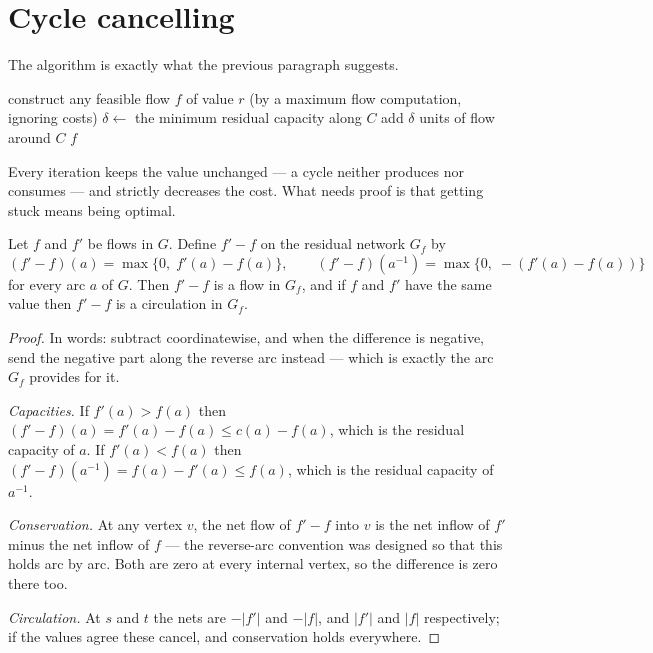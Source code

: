 \section{Cycle cancelling}
\label{sec:mcf-cycle-cancelling}

The algorithm is exactly what the previous paragraph suggests.

\begin{algorithm}[ht]
\caption{Cycle cancelling}
\label{alg:mcf-cycle-cancelling}
\begin{algorithmic}[1]
  \State construct any feasible flow $f$ of value $r$ (by a maximum flow
         computation, ignoring costs)
     \State $\delta \gets$ the minimum residual capacity along $C$
     \State add $\delta$ units of flow around $C$
  \EndWhile
  \State \Return $f$
\end{algorithmic}
\end{algorithm}

Every iteration keeps the value unchanged --- a cycle neither produces nor
consumes --- and strictly decreases the cost. What needs proof is that getting
stuck means being optimal.

\begin{lemma}\label{lem:mcf-difference}
Let $f$ and $f'$ be flows in $G$. Define $f' - f$ on the residual network $G_f$
by
\[ (f'-f)(a) = \max\{0,\; f'(a)-f(a)\}, \qquad
   (f'-f)(a^{-1}) = \max\{0,\; -(f'(a)-f(a))\} \]
for every arc $a$ of $G$. Then $f'-f$ is a flow in $G_f$, and if $f$ and $f'$
have the same value then $f'-f$ is a circulation in $G_f$.
\end{lemma}

\begin{proof}
In words: subtract coordinatewise, and when the difference is negative, send
the negative part along the reverse arc instead --- which is exactly the arc
$G_f$ provides for it.

\emph{Capacities.} If $f'(a) > f(a)$ then $(f'-f)(a) = f'(a)-f(a) \le
c(a)-f(a)$, which is the residual capacity of $a$. If $f'(a) < f(a)$ then
$(f'-f)(a^{-1}) = f(a)-f'(a) \le f(a)$, which is the residual capacity of
$a^{-1}$.

\emph{Conservation.} At any vertex $v$, the net flow of $f'-f$ into $v$ is the
net inflow of $f'$ minus the net inflow of $f$ --- the reverse-arc convention
was designed so that this holds arc by arc. Both are zero at every internal
vertex, so the difference is zero there too.

\emph{Circulation.} At $s$ and $t$ the nets are $-|f'|$ and $-|f|$, and $|f'|$
and $|f|$ respectively; if the values agree these cancel, and conservation holds
everywhere.
\end{proof}

